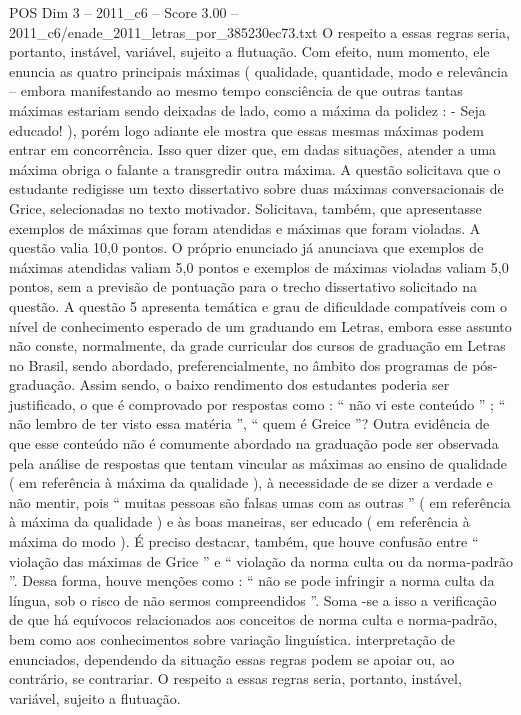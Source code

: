 \begin{textsample}{POS Dim 3 – 2011\_c6 – Score 3.00 – 2011\_c6/enade\_2011\_letras\_por\_385230ec73.txt}
O respeito a essas regras seria, portanto, instável, variável, sujeito a flutuação.
Com efeito, num momento, ele enuncia as quatro principais máximas ( qualidade, quantidade, modo e relevância – embora manifestando ao mesmo tempo consciência de que outras tantas máximas estariam sendo deixadas de lado, como a máxima da polidez : - Seja educado! ), porém logo adiante ele mostra que essas mesmas máximas podem entrar em concorrência.
Isso quer dizer que, em dadas situações, atender a uma máxima obriga o falante a transgredir outra máxima.
A questão solicitava que o estudante redigisse um texto dissertativo sobre duas máximas conversacionais de Grice, selecionadas no texto motivador.
Solicitava, também, que apresentasse exemplos de máximas que foram atendidas e máximas que foram violadas.
A questão valia 10,0 pontos.
O próprio enunciado já anunciava que exemplos de máximas atendidas valiam 5,0 pontos e exemplos de máximas violadas valiam 5,0 pontos, sem a previsão de pontuação para o trecho dissertativo solicitado na questão.
A questão 5 apresenta temática e grau de dificuldade compatíveis com o nível de conhecimento esperado de um graduando em Letras, embora esse assunto não conste, normalmente, da grade curricular dos cursos de graduação em Letras no Brasil, sendo abordado, preferencialmente, no âmbito dos programas de pós-graduação.
Assim sendo, o baixo rendimento dos estudantes poderia ser justificado, o que é comprovado por respostas como : “ não vi este conteúdo ” ; “ não lembro de ter visto essa matéria ”, “ quem é Greice ”?
Outra evidência de que esse conteúdo não é comumente abordado na graduação pode ser observada pela análise de respostas que tentam vincular as máximas ao ensino de qualidade ( em referência à máxima da qualidade ), à necessidade de se dizer a verdade e não mentir, pois “ muitas pessoas são falsas umas com as outras ” ( em referência à máxima da qualidade ) e às boas maneiras, ser educado ( em referência à máxima do modo ).
É preciso destacar, também, que houve confusão entre “ violação das máximas de Grice ” e “ violação da norma culta ou da norma-padrão ”.
Dessa forma, houve menções como : “ não se pode infringir a norma culta da língua, sob o risco de não sermos compreendidos ”.
Soma -se a isso a verificação de que há equívocos relacionados aos conceitos de norma culta e norma-padrão, bem como aos conhecimentos sobre variação linguística. interpretação de enunciados, dependendo da situação essas regras podem se apoiar ou, ao contrário, se contrariar.
O respeito a essas regras seria, portanto, instável, variável, sujeito a flutuação.

\end{textsample}
